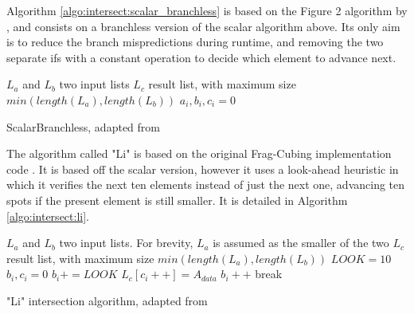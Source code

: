 Algorithm \ref{algo:intersect:scalar_branchless} is based on the Figure 2 algorithm by , and consists on a branchless version of the scalar algorithm above.
Its only aim is to reduce the branch mispredictions during runtime, and removing the two separate ifs with a constant operation to decide which element to advance next.

\begin{algorithm}[!htb]
\SetAlgoLined
{}
 $L_a$ and $L_b$ two input lists\;
 $L_c$ result list, with maximum size $min(length(L_a), length(L_b))$\;
 $a_i, b_i, c_i = 0$\;
 \;
 \caption{ScalarBranchless, adapted from }\label{algo:intersect:scalar_branchless}
\end{algorithm}

The algorithm called "Li" is based on the original Frag-Cubing implementation code \cite{liHighdimensionalOLAPMinimal2004}.
It is based off the scalar version, however it uses a look-ahead heuristic in which it verifies the next ten elements instead of just the next one, advancing ten spots if the present element is still smaller.
It is detailed in Algorithm \ref{algo:intersect:li}.

\begin{algorithm}[!htb]
\SetAlgoLined
{}
 $L_a$ and $L_b$ two input lists. For brevity, $L_a$ is assumed as the smaller of the two\;
 $L_c$ result list, with maximum size $min(length(L_a), length(L_b))$\;
 $LOOK = 10$
 $b_i, c_i = 0$\;
 {
   {
     $b_i += LOOK$\;
   }
   {
     $L_c[c_i++] = A_{data}$\;
     $b_i++$\;
   }
   {
     break\;
   }
 }
 \;
 \caption{"Li" intersection algorithm, adapted from~}\label{algo:intersect:li}
\end{algorithm}

